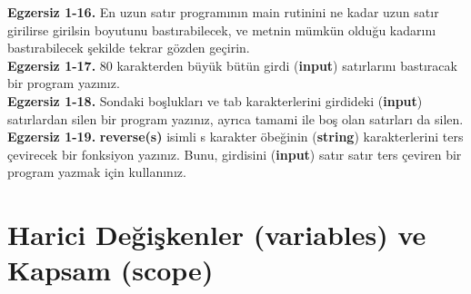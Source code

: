 \documentclass[a4paper,12pt,oneside]{book}
\begin{document}
\noindent \textbf{Egzersiz 1-16.} En uzun satır programının main rutinini ne kadar uzun satır girilirse girilsin boyutunu bastırabilecek, ve metnin mümkün olduğu kadarını bastırabilecek şekilde tekrar gözden geçirin. \\


\noindent \textbf{Egzersiz 1-17.} 80 karakterden büyük bütün girdi (\textbf{input}) satırlarını bastıracak bir program yazınız. \\


\noindent \textbf{Egzersiz 1-18.} Sondaki boşlukları ve tab karakterlerini girdideki (\textbf{input}) satırlardan silen bir program yazınız, ayrıca tamami ile boş olan satırları da silen. \\


\noindent \textbf{Egzersiz 1-19.} \textbf{reverse(s)} isimli s karakter öbeğinin (\textbf{string}) karakterlerini ters çevirecek bir fonksiyon yazınız. Bunu, girdisini (\textbf{input}) satır satır ters çeviren bir program yazmak için kullanınız. \\

\section{Harici Değişkenler (\textbf{variables}) ve Kapsam (\textbf{scope})}
\end{document}
